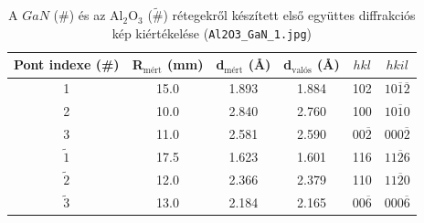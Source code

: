 \documentclass[12pt,a4paper]{article}
\begin{document}
\begin{table}[!h]
\begin{center}
\begin{tabular}{|c|c|c|c|c|c|}
\hline
Pont indexe (\#) & R$_{\textrm{mért}}$ (mm) & d$_{\textrm{mért}}$ (\AA) & d$_{\textrm{valós}}$ (\AA) & $hkl$ & $hkil$ \\
\hline
1 & 15.0 & 1.893 & 1.884 & 102 & $10\overline{1}\overline{2}$ \\
\hline
2 & 10.0 & 2.840 & 2.760 & 100 & $10\overline{1}0$ \\
\hline
3 & 11.0 & 2.581 & 2.590 & $00\overline{2}$ & $000\overline{2}$\\
\hline
\hline
$\widetilde{1}$ & 17.5 & 1.623 & 1.601 & 116 & $11\overline{2}6$\\
\hline
$\widetilde{2}$ & 12.0 & 2.366 & 2.379 & 110 & $11\overline{2}0$\\
\hline
$\widetilde{3}$ & 13.0 & 2.184 & 2.165 & $00\overline{6}$ & $000\overline{6}$\\
\hline
\end{tabular}
\caption{A $GaN$ (\#) és az Al$_2$O$_3$ ($\widetilde{\#}$) rétegekről készített első együttes diffrakciós kép kiértékelése (\texttt{Al2O3\_GaN\_1.jpg})}
\end{center}
\end{table}
\end{document}
